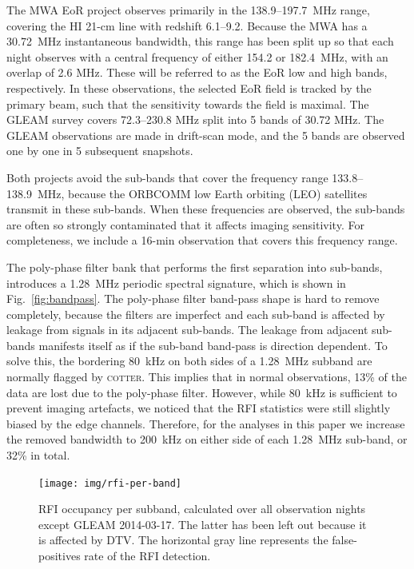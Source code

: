 \documentclass{pasa}
\begin{document}
The MWA EoR project observes primarily in the 138.9--197.7~MHz range, covering the HI 21-cm line with redshift 6.1--9.2. Because the MWA has a 30.72~MHz instantaneous bandwidth, this range has been split up so that each night observes with a central frequency of either 154.2 or 182.4~MHz, with an overlap of 2.6 MHz. These will be referred to as the EoR low and high bands, respectively. In these observations, the selected EoR field is tracked by the primary beam, such that the sensitivity towards the field is maximal. The GLEAM survey covers 72.3--230.8 MHz split into 5 bands of 30.72 MHz. The GLEAM observations are made in drift-scan mode, and the 5 bands are observed one by one in 5 subsequent snapshots.

Both projects avoid the sub-bands that cover the frequency range 133.8--138.9~MHz, because the ORBCOMM low Earth orbiting (LEO) satellites transmit in these sub-bands. When these frequencies are observed, the sub-bands are often so strongly contaminated that it affects imaging sensitivity. For completeness, we include a 16-min observation that covers this frequency range.

The poly-phase filter bank that performs the first separation into sub-bands, introduces a 1.28~MHz periodic spectral signature, which is shown in Fig.~\ref{fig:bandpass}. The poly-phase filter band-pass shape is hard to remove completely, because the filters are imperfect and each sub-band is affected by leakage from signals in its adjacent sub-bands. The leakage from adjacent sub-bands manifests itself as if the sub-band band-pass is direction dependent. To solve this, the bordering 80~kHz on both sides of a 1.28~MHz subband are normally flagged by \textsc{cotter}. This implies that in normal observations, 13\% of the data are lost due to the poly-phase filter. However, while 80~kHz is sufficient to prevent imaging artefacts, we noticed that the RFI statistics were still slightly biased by the edge channels. Therefore, for the analyses in this paper we increase the removed bandwidth to 200~kHz on either side of each 1.28~MHz sub-band, or 32\% in total.
\noindent\begin{figure}
\begin{center}\hspace*{-0.2cm}\texttt{[image: img/rfi-per-band]}
\caption{RFI occupancy per subband, calculated over all observation nights except GLEAM 2014-03-17. The latter has been left out because it is affected by DTV. The horizontal gray line represents the false-positives rate of the RFI detection.}
\label{fig:rfi-per-band}
\end{center}
\end{figure}
\end{document}
